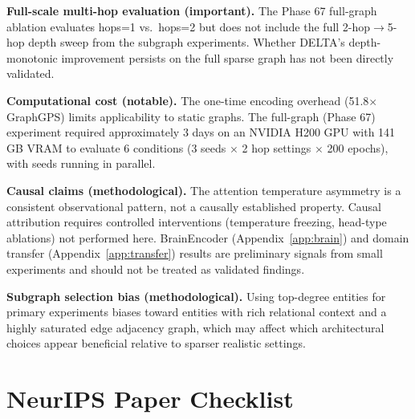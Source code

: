 \documentclass{article}
\begin{document}
\textbf{Full-scale multi-hop evaluation (important).}
The Phase 67 full-graph ablation evaluates hops=1 vs.\ hops=2 but does not include the full 2-hop$\to$5-hop depth sweep from the subgraph experiments. Whether DELTA's depth-monotonic improvement persists on the full sparse graph has not been directly validated.

\textbf{Computational cost (notable).}
The one-time encoding overhead (51.8$\times$ GraphGPS) limits applicability to static graphs. The full-graph (Phase 67) experiment required approximately 3 days on an NVIDIA H200 GPU with 141 GB VRAM to evaluate 6 conditions (3 seeds $\times$ 2 hop settings $\times$ 200 epochs), with seeds running in parallel.

\textbf{Causal claims (methodological).}
The attention temperature asymmetry is a consistent observational pattern, not a causally established property. Causal attribution requires controlled interventions (temperature freezing, head-type ablations) not performed here. BrainEncoder (Appendix~\ref{app:brain}) and domain transfer (Appendix~\ref{app:transfer}) results are preliminary signals from small experiments and should not be treated as validated findings.

\textbf{Subgraph selection bias (methodological).}
Using top-degree entities for primary experiments biases toward entities with rich relational context and a highly saturated edge adjacency graph, which may affect which architectural choices appear beneficial relative to sparser realistic settings.

\newpage
\section*{NeurIPS Paper Checklist}
\end{document}

